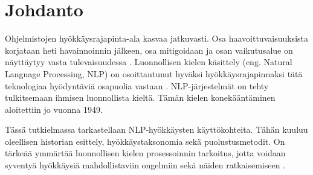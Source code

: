 \chapter{Johdanto\label{intro}}

Ohjelmistojen hyökkäysrajapinta-ala kasvaa jatkuvasti. Osa haavoittuvaisuuksista korjataan heti havainnoinnin jälkeen, osa mitigoidaan ja osan vaikutusalue on näyttäytyy vasta tulevaisuudessa . Luonnollisen kielen käsittely (eng. Natural Language Processing, NLP) on osoittautunut hyväksi hyökkäysrajapinnaksi tätä teknologiaa hyödyntäviä osapuolia vastaan \citep{boucher2021bad}. NLP-järjestelmät on tehty tulkitsemaan ihmisen luonnollista kieltä. Tämän kielen konekääntäminen aloitettiin jo vuonna 1949.

Tässä tutkielmassa tarkastellaan NLP-hyökkäysten käyttökohteita. Tähän kuuluu oleellisen historian esittely, hyökkäystaksonomia sekä puolustusmetodit. On tärkeää ymmärtää luonnollisen kielen prosessoinnin tarkoitus, jotta voidaan syventyä hyökkäysiä mahdollistaviin ongelmiin sekä näiden ratkaisemiseen \citep{yang-etal-2021-rethinking}.